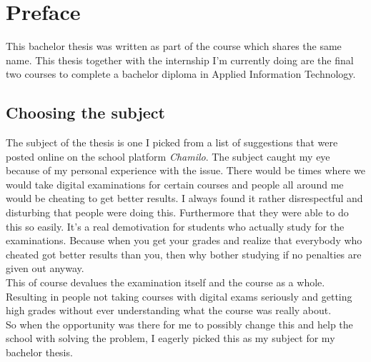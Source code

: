 
\chapter*{Preface}
\label{ch:voorwoord}


This bachelor thesis was written as part of the course which shares the same name. This thesis together with the internship I'm currently doing are the final two courses to complete a bachelor diploma in Applied Information Technology.
\section*{Choosing the subject}
The subject of the thesis is one I picked from a list of suggestions that were posted online on the school platform \textit{Chamilo}. The subject caught my eye because of my personal experience with the issue. There would be times where we would take digital examinations for certain courses and people all around me would be cheating to get better results. I always found it rather disrespectful and disturbing that people were doing this. Furthermore that they were able to do this so easily. It's a real demotivation for students who actually study for the examinations. Because when you get your grades and realize that everybody who cheated got better results than you, then why bother studying if no penalties are given out anyway.\\
This of course devalues the examination itself and the course as a whole. Resulting in people not taking courses with digital exams seriously and getting high grades without ever understanding what the course was really about.\\
So when the opportunity was there for me to possibly change this and help the school with solving the problem, I eagerly picked this as my subject for my bachelor thesis.\\
